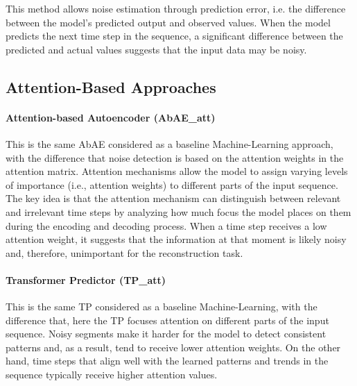 \documentclass[conference]{IEEEtran}
\begin{document}
This method allows noise estimation through prediction error, i.e. the difference between the model's predicted output and observed values. When the model predicts the next time step in the sequence, a significant difference between the predicted and actual values suggests that the input data may be noisy. 


\subsection{Attention-Based Approaches}

\paragraph{Attention-based Autoencoder (AbAE\_att)} This is the same AbAE considered as a baseline Machine-Learning approach, with the difference that noise detection is based on the attention weights in the attention matrix. Attention mechanisms allow the model to assign varying levels of importance (i.e., attention weights) to different parts of the input sequence. The key idea is that the attention mechanism can distinguish between relevant and irrelevant time steps by analyzing how much focus the model places on them during the encoding and decoding process. When a time step receives a low attention weight, it suggests that the information at that moment is likely noisy and, therefore, unimportant for the reconstruction task.

\paragraph{Transformer Predictor (TP\_att)} This is the same TP considered as a baseline Machine-Learning, with the difference that, here the TP focuses attention on different parts of the input sequence. Noisy segments make it harder for the model to detect consistent patterns and, as a result, tend to receive lower attention weights. On the other hand, time steps that align well with the learned patterns and trends in the sequence typically receive higher attention values.
\end{document}
